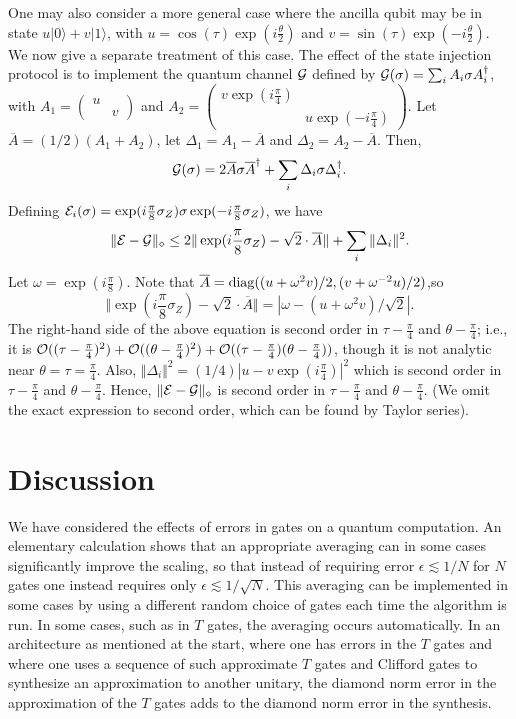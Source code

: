 \documentclass[aps,prl,amsmath,amssymb,amsfonts,superscriptaddress,floatfix]{revtex4}
\newcommand{\be}{\begin{equation}}
\newcommand{\ee}{\end{equation}}
\newcommand{\cO}{{\cal O}}
\begin{document}
One may also consider a more general case where the ancilla qubit may be in state $u|0\rangle+v|1\rangle$, 
with $u=\cos(\tau)\exp(i\frac{\theta}{2})$ and $v=\sin(\tau)\exp(-i\frac{\theta}{2})$.  We now give a separate treatment of this case.  The effect of the state injection protocol is to
implement the quantum channel
${\cal G}$ defined by
${\cal G}(\sigma)=\sum_i A_i \sigma A_i^\dagger$, with
$A_1=
\begin{pmatrix}u\\&v\end{pmatrix}$
and
$A_2=
\begin{pmatrix}v \exp(i\frac{\pi}{4})\\ & u\exp(-i\frac{\pi}{4})\end{pmatrix}$.
Let $\overline A = (1/2)(A_1+A_2)$, let $\Delta_1=A_1-\overline A$ and $\Delta_2=A_2-\overline A$.
Then,
\be
{\cal G}(\sigma)=2 \overline A \sigma \overline A^\dagger+\sum_i \Delta_i \sigma \Delta_i^\dagger.
\ee
Defining ${\cal E}_i(\sigma)=\exp(i \frac{\pi}{8}\sigma_Z) \sigma \exp(-i\frac{\pi}{8}\sigma_Z)$,
we have
\be
\Vert {\cal E}-{\cal G}\Vert_\diamond \leq 2\Vert \exp(i \frac{\pi}{8}\sigma_Z) -\sqrt{2} \cdot \overline A \Vert+\sum_i \Vert \Delta_i \Vert^2.
\ee
Let $\omega=\exp(i\frac{\pi}{8})$.
Note that $\overline A={\rm diag}((u+\omega^2 v)/2,(v+\omega^{-2} u)/2)$,so
\be
\label{2ndord}
\Vert \exp(i \frac{\pi}{8}\sigma_Z) - \sqrt{2} \cdot \overline A \Vert=|\omega-(u+\omega^2 v)/\sqrt{2}|.
\ee
The right-hand side of the above equation is second order in $\tau-\frac{\pi}{4}$ and $\theta-\frac{\pi}{4}$;  i.e., it is
$\cO((\tau-\frac{\pi}{4})^2)+\cO((\theta-\frac{\pi}{4})^2)+\cO((\tau-\frac{\pi}{4})(\theta-\frac{\pi}{4}))$, though it is not analytic near $\theta=\tau=\frac{\pi}{4}$.
Also, $\Vert \Delta_i \Vert^2 = (1/4) |u-v \exp(i\frac{\pi}{4})|^2$ which is second order in $\tau-\frac{\pi}{4}$ and $\theta-\frac{\pi}{4}$.
Hence, 
$\Vert {\cal E}-{\cal G}\Vert_\diamond$ is second order in $\tau-\frac{\pi}{4}$ and $\theta-\frac{\pi}{4}$.
 (We omit the exact expression to second order, which can be found by Taylor series).




\section{Discussion}
We have considered the effects of errors in gates on a quantum computation.  An elementary calculation shows that an appropriate averaging can in some cases significantly improve the scaling, so that instead of requiring error $\epsilon\lesssim 1/N$ for $N$ gates one instead requires only $\epsilon \lesssim 1/\sqrt{N}$.  This averaging can be implemented in some cases by using a different random choice of gates each time the algorithm is run.  In some cases, such as in $T$ gates, the averaging occurs automatically.  In an architecture as mentioned at the start, 
where one has errors in the $T$ gates and where one uses a sequence of such approximate $T$ gates and Clifford gates to synthesize an approximation to another unitary, 
the diamond norm error in the approximation of the $T$
gates adds to the diamond norm error in the synthesis.
\end{document}
